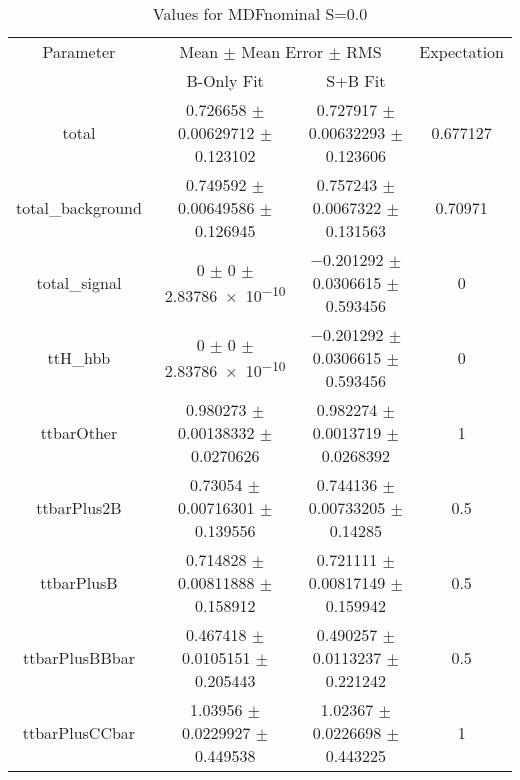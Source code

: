 \begin{table}
\centering
\caption{Values for MDFnominal S=0.0}
\begin{tabular}{cccc}
\toprule
Parameter & \multicolumn{2}{c}{Mean $\pm$ Mean Error $\pm$ RMS} & Expectation\\
 & B-Only Fit & S+B Fit & \\
\midrule
total & \num{0.726658} $\pm$ \num{0.00629712} $\pm$ \num{0.123102} & \num{0.727917} $\pm$ \num{0.00632293} $\pm$ \num{0.123606} & \num{0.677127}\\
total\_background & \num{0.749592} $\pm$ \num{0.00649586} $\pm$ \num{0.126945} & \num{0.757243} $\pm$ \num{0.0067322} $\pm$ \num{0.131563} & \num{0.70971}\\
total\_signal & \num{0} $\pm$ \num{0} $\pm$ \num{2.83786e-10} & \num{-0.201292} $\pm$ \num{0.0306615} $\pm$ \num{0.593456} & \num{0}\\
ttH\_hbb & \num{0} $\pm$ \num{0} $\pm$ \num{2.83786e-10} & \num{-0.201292} $\pm$ \num{0.0306615} $\pm$ \num{0.593456} & \num{0}\\
ttbarOther & \num{0.980273} $\pm$ \num{0.00138332} $\pm$ \num{0.0270626} & \num{0.982274} $\pm$ \num{0.0013719} $\pm$ \num{0.0268392} & \num{1}\\
ttbarPlus2B & \num{0.73054} $\pm$ \num{0.00716301} $\pm$ \num{0.139556} & \num{0.744136} $\pm$ \num{0.00733205} $\pm$ \num{0.14285} & \num{0.5}\\
ttbarPlusB & \num{0.714828} $\pm$ \num{0.00811888} $\pm$ \num{0.158912} & \num{0.721111} $\pm$ \num{0.00817149} $\pm$ \num{0.159942} & \num{0.5}\\
ttbarPlusBBbar & \num{0.467418} $\pm$ \num{0.0105151} $\pm$ \num{0.205443} & \num{0.490257} $\pm$ \num{0.0113237} $\pm$ \num{0.221242} & \num{0.5}\\
ttbarPlusCCbar & \num{1.03956} $\pm$ \num{0.0229927} $\pm$ \num{0.449538} & \num{1.02367} $\pm$ \num{0.0226698} $\pm$ \num{0.443225} & \num{1}\\
\bottomrule
\end{tabular}
\end{table}